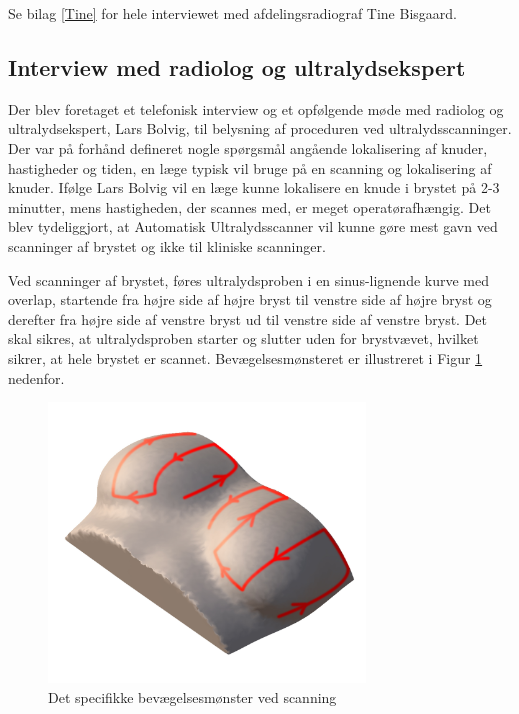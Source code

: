 Se bilag \ref{Tine} for hele interviewet med afdelingsradiograf Tine Bisgaard. 

\subsection{Interview med radiolog og ultralydsekspert}
Der blev foretaget et telefonisk interview og et opfølgende møde med radiolog og ultralydsekspert, Lars Bolvig, til belysning af proceduren ved ultralydsscanninger. Der var på forhånd defineret nogle spørgsmål angående lokalisering af knuder, hastigheder og tiden, en læge typisk vil bruge på en scanning og lokalisering af knuder. Ifølge Lars Bolvig vil en læge kunne lokalisere en knude i brystet på 2-3 minutter, mens hastigheden, der scannes med, er meget operatørafhængig. Det blev tydeliggjort, at Automatisk Ultralydsscanner vil kunne gøre mest gavn ved scanninger af brystet og ikke til kliniske scanninger. 

Ved scanninger af brystet, føres ultralydsproben i en sinus-lignende kurve med overlap, startende fra højre side af højre bryst til venstre side af højre bryst og derefter fra højre side af venstre bryst ud til venstre side af venstre bryst. Det skal sikres, at ultralydsproben starter og slutter uden for brystvævet, hvilket sikrer, at hele brystet er scannet. Bevægelsesmønsteret er illustreret i Figur \ref{Probensbevagelse} nedenfor. 

\begin{figure}[H]
    \centering
    \includegraphics[width=0.75\textwidth]{figurer/d/probebevagelse}
    \caption{Det specifikke bevægelsesmønster ved scanning}
    \label{Probensbevagelse}
\end{figure}

